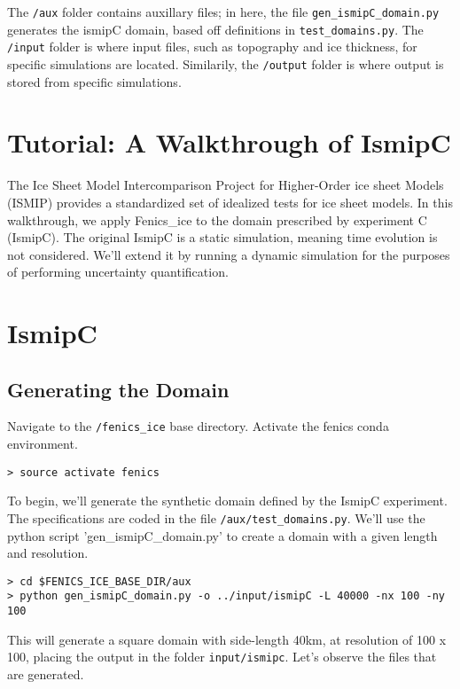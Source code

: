 \documentclass[11pt, reqno, nocenter]{article}
\begin{document}
The {\tt /aux} folder contains auxillary files; in here, the file {\tt gen\_ismipC\_domain.py} generates the ismipC domain,  based off definitions in {\tt test\_domains.py}. The {\tt /input} folder is where input files, such as topography and ice thickness, for specific simulations are located. Similarily, the {\tt /output} folder is where output is stored from specific simulations.

\section{Tutorial: A Walkthrough of IsmipC}

The Ice Sheet Model Intercomparison Project for Higher-Order ice sheet Models (ISMIP) provides a standardized set of idealized tests for ice sheet models. In this walkthrough, we apply Fenics\_ice to the domain prescribed by experiment C (IsmipC). The original IsmipC is a static simulation, meaning time evolution is not considered. We'll extend it by running a dynamic simulation for the purposes of performing uncertainty quantification.

\section{IsmipC}

\subsection{Generating the Domain}

Navigate to the {\tt /fenics\_ice} base directory. Activate the fenics conda environment.

\begin{verbatim}
> source activate fenics 
\end{verbatim}

To begin, we'll generate the synthetic domain defined by the IsmipC experiment. The specifications are coded in the file {\tt /aux/test\_domains.py}. We'll use the python script 'gen\_ismipC\_domain.py' to create a domain with a given length and resolution.

\begin{verbatim}
> cd $FENICS_ICE_BASE_DIR/aux 
> python gen_ismipC_domain.py -o ../input/ismipC -L 40000 -nx 100 -ny 100 
\end{verbatim}

This will generate a square domain with side-length 40\si{\kilo\metre}, at resolution of 100 x 100, placing the output in the folder {\tt input/ismipc}.
Let's observe the files that are generated.
\end{document}
